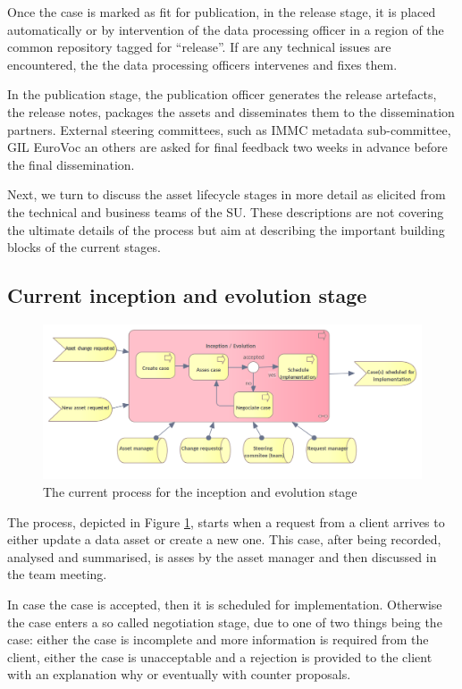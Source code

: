 	Once the case is marked as fit for publication, in the release stage, it is placed automatically or by intervention of the data processing officer in a region of the common repository tagged for ``release''. If are any technical issues are encountered, the the data processing officers intervenes and fixes them.
	
	
	In the publication stage, the publication officer generates the release artefacts, the release notes, packages the assets and disseminates them to the dissemination partners. External steering committees, such as IMMC metadata sub-committee, GIL EuroVoc an others are asked for final feedback two weeks in advance before the final dissemination.
	
	Next, we turn to discuss the asset lifecycle stages in more detail as elicited from the technical and business teams of the SU. These descriptions are not covering the ultimate details of the process but aim at describing the important building blocks of the current stages. 
	
	\subsection{Current inception and evolution stage}
	\label{sec:inception-current}
	
	\begin{figure}[h]
		\centering
		\includegraphics[width=.8\textwidth]{images/business/current/InceptionEvolution.png}
		\caption{The current process for the inception and evolution stage}
		\label{fig:evolution-current}
	\end{figure}		
	
	The process, depicted in Figure \ref{fig:evolution-current}, starts when a request from a client arrives to either update a data asset or create a new one. This case, after being recorded, analysed and summarised, is asses by the asset manager and then discussed in the team meeting. 
	
	
	In case the case is accepted, then it is scheduled for implementation. Otherwise the case enters a so called negotiation stage, due to one of two things being the case: either the case is incomplete and more information is required from the client, either the case is unacceptable and a rejection is provided to the client with an explanation why or eventually with counter proposals. 
	
